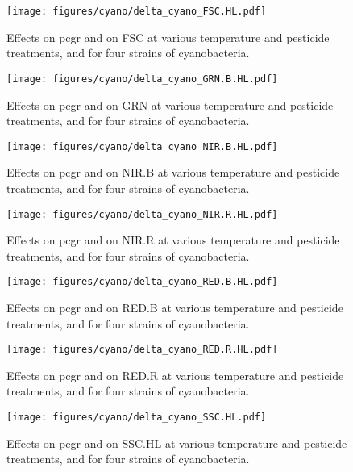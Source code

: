 \begin{figure}[hbt!]
    \centering
    \texttt{[image: figures/cyano/delta\_cyano\_FSC.HL.pdf]}
    \caption{Effects on pcgr and on FSC at various temperature and pesticide treatments, and for four strains of cyanobacteria.}
    \label{fig:delta_cyano_FSC.HL}
\end{figure}

\begin{figure}[hbt!]
    \centering
    \texttt{[image: figures/cyano/delta\_cyano\_GRN.B.HL.pdf]}
    \caption{Effects on pcgr and on GRN at various temperature and pesticide treatments, and for four strains of cyanobacteria.}
    \label{fig:delta_cyano_GRN.B.HL}
\end{figure}

\begin{figure}[hbt!]
    \centering
    \texttt{[image: figures/cyano/delta\_cyano\_NIR.B.HL.pdf]}
    \caption{Effects on pcgr and on NIR.B at various temperature and pesticide treatments, and for four strains of cyanobacteria.}
    \label{fig:delta_cyano_NIR.B.HL}
\end{figure}

\begin{figure}[hbt!]
    \centering
    \texttt{[image: figures/cyano/delta\_cyano\_NIR.R.HL.pdf]}
    \caption{Effects on pcgr and on NIR.R at various temperature and pesticide treatments, and for four strains of cyanobacteria.}
    \label{fig:delta_cyano_NIR.R.HL}
\end{figure}

\begin{figure}[hbt!]
    \centering
    \texttt{[image: figures/cyano/delta\_cyano\_RED.B.HL.pdf]}
    \caption{Effects on pcgr and on RED.B at various temperature and pesticide treatments, and for four strains of cyanobacteria.}
    \label{fig:delta_cyano_RED.B.HL}
\end{figure}

\begin{figure}[hbt!]
    \centering
    \texttt{[image: figures/cyano/delta\_cyano\_RED.R.HL.pdf]}
    \caption{Effects on pcgr and on RED.R at various temperature and pesticide treatments, and for four strains of cyanobacteria.}
    \label{fig:delta_cyano_RED.R.HL}
\end{figure}

\begin{figure}[hbt!]
    \centering
    \texttt{[image: figures/cyano/delta\_cyano\_SSC.HL.pdf]}
    \caption{Effects on pcgr and on SSC.HL at various temperature and pesticide treatments, and for four strains of cyanobacteria.}
    \label{fig:delta_cyano_SSC.HL}
\end{figure}

